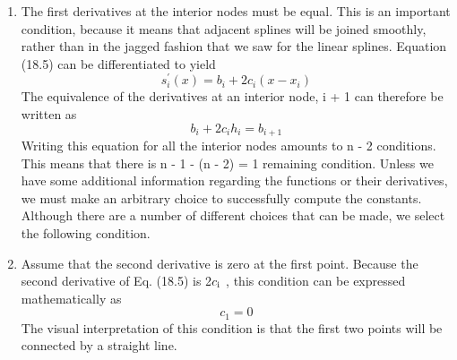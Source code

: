 \documentclass[../main.tex]{subfiles}
\begin{document}
\begin{enumerate}
    \item The first derivatives at the interior nodes must be equal. This is an important condition,
    because it means that adjacent splines will be joined smoothly, rather than in the jagged
    fashion that we saw for the linear splines. Equation (18.5) can be differentiated to yield
    \begin{equation}
        s_{i}^{\prime}(x)=b_{i}+2 c_{i}\left(x-x_{i}\right) \nonumber
        \end{equation}
        The equivalence of the derivatives at an interior node, i + 1 can therefore be written as
        \begin{equation}
            \tag{18.9}
            b_{i}+2 c_{i} h_{i}=b_{i+1}
            \end{equation}
            Writing this equation for all the interior nodes amounts to n - 2 conditions. This
means that there is n - 1 - (n - 2) = 1 remaining condition. Unless we have some
additional information regarding the functions or their derivatives, we must make an
arbitrary choice to successfully compute the constants. Although there are a number of
different choices that can be made, we select the following condition.

    \item 
    Assume that the second derivative is zero at the first point. Because the second derivative of Eq. (18.5) is 2$c\textsubscript{i}$ , this condition can be expressed mathematically as
    \begin{equation}
        c_{1}=0 \nonumber
    \end{equation}
    The visual interpretation of this condition is that the first two points will be connected
    by a straight line.
\end{enumerate}
\end{document}
